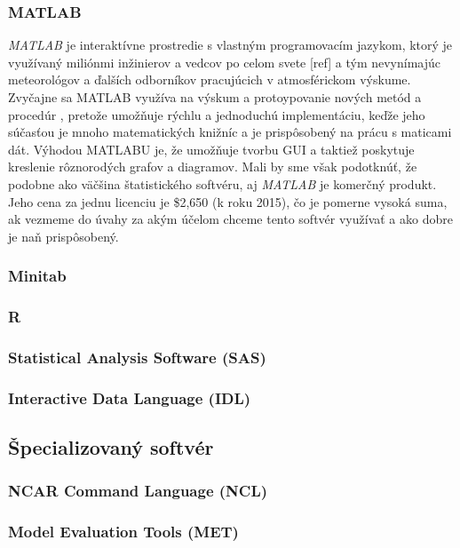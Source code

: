 \subsubsection{MATLAB}
\textit{MATLAB} je interaktívne prostredie s vlastným programovacím jazykom, ktorý je využívaný miliónmi inžinierov a vedcov po celom svete [ref] a tým nevynímajúc meteorológov a ďalších odborníkov pracujúcich v atmosférickom výskume. 
Zvyčajne sa MATLAB využíva na výskum a protoypovanie nových metód a procedúr \cite{VerifSoft}, pretože umožňuje rýchlu a jednoduchú implementáciu, keďže jeho súčasťou je mnoho matematických knižníc a je prispôsobený na prácu s maticami dát.
Výhodou MATLABU je, že umožňuje tvorbu GUI a taktiež poskytuje kreslenie rôznorodých grafov a diagramov.
Mali by sme však podotknúť, že podobne ako väčšina štatistického softvéru, aj \textit{MATLAB} je komerčný produkt. Jeho cena za jednu licenciu je \$2,650 (k roku 2015), čo je pomerne vysoká suma, ak vezmeme do úvahy za akým účelom chceme tento softvér využívať a ako dobre je naň prispôsobený.

\subsubsection{Minitab} %


\subsubsection{R}

\subsubsection[SAS]{Statistical Analysis Software (SAS)}

\subsubsection[IDL]{Interactive Data Language (IDL)}

\subsection{Špecializovaný softvér}

\subsubsection[NCL]{NCAR Command Language (NCL)}

\subsubsection[MET]{Model Evaluation Tools (MET)}

